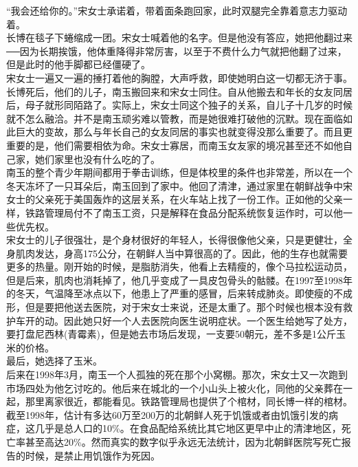 “我会还给你的。”宋女士承诺着，带着面条跑回家，此时双腿完全靠着意志力驱动着。\\

长博在毯子下蜷缩成一团。宋女士喊着他的名字。但是他没有答应，她把他翻过来──因为长期挨饿，他体重降得非常厉害，以至于不费什么力气就把他翻了过来，但是此时的他手脚都已经僵硬了。\\

宋女士一遍又一遍的捶打着他的胸膛，大声呼救，即使她明白这一切都无济于事。\\

长博死后，他们的儿子，南玉搬回来和宋女士同住。自从他搬去和年长的女友同居后，母子就形同陌路了。实际上，宋女士同这个独子的关系，自儿子十几岁的时候就不怎么融洽。并不是南玉顽劣难以管教，而是她很难打破他的沉默。现在面临如此巨大的变故，那么与年长自己的女友同居的事实也就变得没那么重要了。而且更重要的是，他们需要相依为命。宋女士寡居，而南玉女友家的境况甚至还不如他自己家，她们家里也没有什么吃的了。\\

南玉的整个青少年期间都用于拳击训练，但是体校里的条件也非常差，所以在一个冬天冻坏了一只耳朵后，南玉回到了家中。他回了清津，通过家里在朝鲜战争中宋女士的父亲死于美国轰炸的这层关系，在火车站上找了一份工作。正如他的父亲一样，铁路管理局付不了南玉工资，只是解释在食品分配系统恢复运作时，可以他一些优先权。\\

宋女士的儿子很强壮，是个身材很好的年轻人，长得很像他父亲，只是更健壮，全身肌肉发达，身高175公分，在朝鲜人当中算很高的了。因此，他的生存也就需要更多的热量。刚开始的时候，是脂肪消失，他看上去精瘦的，像个马拉松运动员，但是后来，肌肉也消耗掉了，他几乎变成了一具皮包骨头的骷髅。在1997至1998年的冬天，气温降至冰点以下，他患上了严重的感冒，后来转成肺炎。即使瘦的不成形，但是要把他送去医院，对于宋女士来说，还是太重了。那个时候也根本没有救护车开的动。因此她只好一个人去医院向医生说明症状。一个医生给她写了处方，要打盘尼西林(青霉素)，但是她去市场后发现，一支要50朝元，差不多是1公斤玉米的价格。\\

最后，她选择了玉米。\\

后来在1998年3月，南玉一个人孤独的死在那个小窝棚。那次，宋女士又一次跑到市场四处为他乞讨吃的。他后来在城北的一个小山头上被火化，同他的父亲葬在一起，那里离家很近，都能看见。铁路管理局也提供了个棺材，同长博一样的棺材。\\

截至1998年，估计有多达60万至200万的北朝鲜人死于饥饿或者由饥饿引发的病症，这几乎是总人口的10\%。在食品配给系统比其它地区更早中止的清津地区，死亡率甚至高达20\%。然而真实的数字似乎永远无法统计，因为北朝鲜医院写死亡报告的时候，是禁止用饥饿作为死因。\\

